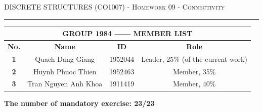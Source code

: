 \documentclass{article}
\begin{document}
{\scshape } \hfill {\scshape DISCRETE STRUCTURES (CO1007) - Homework 09 - Connectivity} \hfill {\scshape }
\smallskip

\hrule

\begin{table}[h]
\begin{tabular}{|c|c|c|c|}
\hline
\multicolumn{4}{|c|}{\textbf{GROUP 1984 ------ MEMBER LIST}}        \\ \hline
\textbf{No.} & \textbf{Name}        & \textbf{ID} & \textbf{Role} \\ \hline
\textbf{1}   & Quach Dang Giang     & 1952044     & Leader, 25\% (of the current work)  \\ \hline
\textbf{2}   & Huynh Phuoc Thien    & 1952463     & Member, 35\%  \\ \hline
\textbf{3}   & Tran Nguyen Anh Khoa & 1911419     & Member, 40\%  \\ \hline
\end{tabular}
\end{table}
\textbf{The number of mandatory exercise: 23/23}
\end{document}
